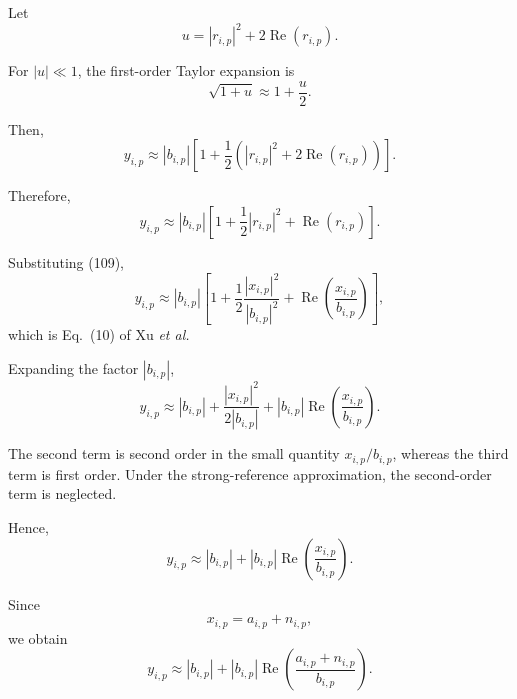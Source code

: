 \documentclass[12pt,a4paper]{article}
\begin{document}
Let
\begin{equation}
u
=
|r_{i,p}|^2
+
2\operatorname{Re}(r_{i,p}).
\tag{112}
\end{equation}

For $|u|\ll1$, the first-order Taylor expansion is
\begin{equation}
\sqrt{1+u}
\approx
1+\frac{u}{2}.
\tag{113}
\end{equation}

Then,
\begin{equation}
y_{i,p}
\approx
|b_{i,p}|
\left[
1+
\frac{1}{2}
\left(
|r_{i,p}|^2
+
2\operatorname{Re}(r_{i,p})
\right)
\right].
\tag{114}
\end{equation}

Therefore,
\begin{equation}
y_{i,p}
\approx
|b_{i,p}|
\left[
1+
\frac{1}{2}|r_{i,p}|^2
+
\operatorname{Re}(r_{i,p})
\right].
\tag{115}
\end{equation}

Substituting (109),
\begin{equation}
y_{i,p}
\approx
|b_{i,p}|
\left[
1+
\frac{1}{2}
\frac{|x_{i,p}|^2}{|b_{i,p}|^2}
+
\operatorname{Re}
\left(
\frac{x_{i,p}}{b_{i,p}}
\right)
\right],
\tag{116}
\end{equation}
which is Eq.~(10) of Xu \emph{et al.}

Expanding the factor $|b_{i,p}|$,
\begin{equation}
y_{i,p}
\approx
|b_{i,p}|
+
\frac{|x_{i,p}|^2}{2|b_{i,p}|}
+
|b_{i,p}|
\operatorname{Re}
\left(
\frac{x_{i,p}}{b_{i,p}}
\right).
\tag{117}
\end{equation}

The second term is second order in the small quantity
$x_{i,p}/b_{i,p}$, whereas the third term is first order. Under the
strong-reference approximation, the second-order term is neglected.

Hence,
\begin{equation}
\boxed{
y_{i,p}
\approx
|b_{i,p}|
+
|b_{i,p}|
\operatorname{Re}
\left(
\frac{x_{i,p}}{b_{i,p}}
\right)
}.
\tag{118}
\end{equation}

Since
\begin{equation}
x_{i,p}
=
a_{i,p}+n_{i,p},
\tag{119}
\end{equation}
we obtain
\begin{equation}
y_{i,p}
\approx
|b_{i,p}|
+
|b_{i,p}|
\operatorname{Re}
\left(
\frac{a_{i,p}+n_{i,p}}{b_{i,p}}
\right).
\tag{120}
\end{equation}
\end{document}
